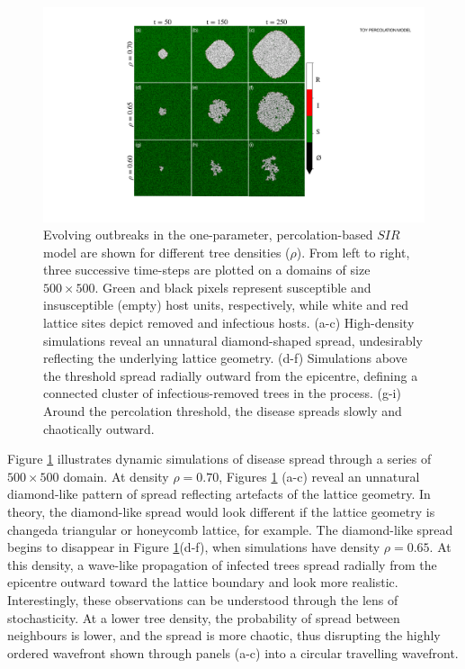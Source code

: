 \begin{figure}
    \centering
    \includegraphics[scale=0.50]{chapter3/figures/figure1-1param-perc.pdf}
    \caption{
        Evolving outbreaks in the one-parameter, percolation-based $SIR$ model are shown for different tree densities ($\rho$).
        From left to right, three successive time-steps are plotted on a domains of size $500 \times 500$.
        Green and black pixels represent susceptible and insusceptible (empty) host units, respectively, 
        while white and red lattice sites depict removed and infectious hosts. 
        (a-c) High-density simulations reveal an unnatural diamond-shaped spread, undesirably reflecting the underlying lattice geometry.
        (d-f) Simulations above the threshold spread radially outward from the epicentre, defining a connected cluster of infectious-removed trees in the process. (g-i) Around the percolation threshold, the disease spreads slowly and chaotically outward. 
        }
    \label{fig:ch3-perc-spread}
\end{figure}

Figure \ref{fig:ch3-perc-spread} illustrates dynamic simulations of disease spread through a 
series of $500 \times 500 $ domain. At density $\rho=0.70$, Figures \ref{fig:ch3-perc-spread} (a-c)
reveal an unnatural diamond-like pattern of spread reflecting artefacts of the lattice geometry.
In theory, the diamond-like spread would look different if the lattice geometry is changed\textemdash a
triangular or honeycomb lattice, for example. The diamond-like spread begins to disappear in 
Figure \ref{fig:ch3-perc-spread}(d-f), when simulations have density $\rho=0.65$.
At this density, a wave-like propagation of infected trees spread radially from the epicentre outward 
toward the lattice boundary and look more realistic.
Interestingly, these observations can be understood through the lens of stochasticity. At a lower tree density, the probability of 
spread between neighbours is lower, and the spread is more chaotic, thus disrupting the highly ordered wavefront shown 
through panels (a-c) into a circular travelling wavefront.


